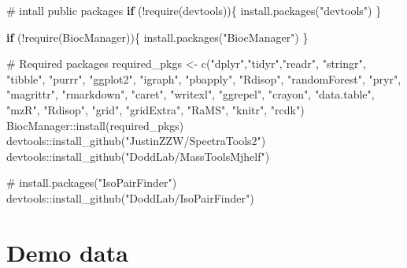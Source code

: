 \documentclass[
  letterpaper,
  DIV=11,
  numbers=noendperiod]{scrreprt}
\newenvironment{Shaded}{\begin{snugshade}}{\end{snugshade}}
\newcommand{\CommentTok}[1]{\textcolor[rgb]{0.37,0.37,0.37}{#1}}
\newcommand{\ControlFlowTok}[1]{\textcolor[rgb]{0.00,0.23,0.31}{\textbf{#1}}}
\newcommand{\FunctionTok}[1]{\textcolor[rgb]{0.28,0.35,0.67}{#1}}
\newcommand{\NormalTok}[1]{\textcolor[rgb]{0.00,0.23,0.31}{#1}}
\newcommand{\OtherTok}[1]{\textcolor[rgb]{0.00,0.23,0.31}{#1}}
\newcommand{\SpecialCharTok}[1]{\textcolor[rgb]{0.37,0.37,0.37}{#1}}
\newcommand{\StringTok}[1]{\textcolor[rgb]{0.13,0.47,0.30}{#1}}
\begin{document}
\begin{Shaded}
\begin{Highlighting}[]
\CommentTok{\# intall public packages}
\ControlFlowTok{if}\NormalTok{ (}\SpecialCharTok{!}\FunctionTok{require}\NormalTok{(devtools))\{}
    \FunctionTok{install.packages}\NormalTok{(}\StringTok{"devtools"}\NormalTok{)}
\NormalTok{\}}

\ControlFlowTok{if}\NormalTok{ (}\SpecialCharTok{!}\FunctionTok{require}\NormalTok{(BiocManager))\{}
    \FunctionTok{install.packages}\NormalTok{(}\StringTok{"BiocManager"}\NormalTok{)}
\NormalTok{\}}

\CommentTok{\# Required packages}
\NormalTok{required\_pkgs }\OtherTok{\textless{}{-}} \FunctionTok{c}\NormalTok{(}\StringTok{"dplyr"}\NormalTok{,}\StringTok{"tidyr"}\NormalTok{,}\StringTok{"readr"}\NormalTok{, }\StringTok{"stringr"}\NormalTok{, }\StringTok{"tibble"}\NormalTok{, }\StringTok{"purrr"}\NormalTok{,}
                   \StringTok{"ggplot2"}\NormalTok{, }\StringTok{"igraph"}\NormalTok{, }\StringTok{"pbapply"}\NormalTok{, }\StringTok{"Rdisop"}\NormalTok{, }\StringTok{"randomForest"}\NormalTok{, }\StringTok{"pryr"}\NormalTok{, }
                   \StringTok{"magrittr"}\NormalTok{, }\StringTok{"rmarkdown"}\NormalTok{, }\StringTok{"caret"}\NormalTok{, }\StringTok{"writexl"}\NormalTok{, }\StringTok{"ggrepel"}\NormalTok{, }\StringTok{"crayon"}\NormalTok{, }
                   \StringTok{"data.table"}\NormalTok{, }\StringTok{"mzR"}\NormalTok{, }\StringTok{"Rdisop"}\NormalTok{, }\StringTok{"grid"}\NormalTok{, }\StringTok{"gridExtra"}\NormalTok{, }\StringTok{"RaMS"}\NormalTok{, }\StringTok{"knitr"}\NormalTok{,}
                   \StringTok{"rcdk"}\NormalTok{)}
\NormalTok{BiocManager}\SpecialCharTok{::}\FunctionTok{install}\NormalTok{(required\_pkgs)}
\NormalTok{devtools}\SpecialCharTok{::}\FunctionTok{install\_github}\NormalTok{(}\StringTok{"JustinZZW/SpectraTools2"}\NormalTok{)}
\NormalTok{devtools}\SpecialCharTok{::}\FunctionTok{install\_github}\NormalTok{(}\StringTok{"DoddLab/MassToolsMjhelf"}\NormalTok{)}

\CommentTok{\# install.packages("IsoPairFinder")}
\NormalTok{devtools}\SpecialCharTok{::}\FunctionTok{install\_github}\NormalTok{(}\StringTok{"DoddLab/IsoPairFinder"}\NormalTok{)}
\end{Highlighting}
\end{Shaded}

\section{Demo data}\label{demo-data}
\end{document}
